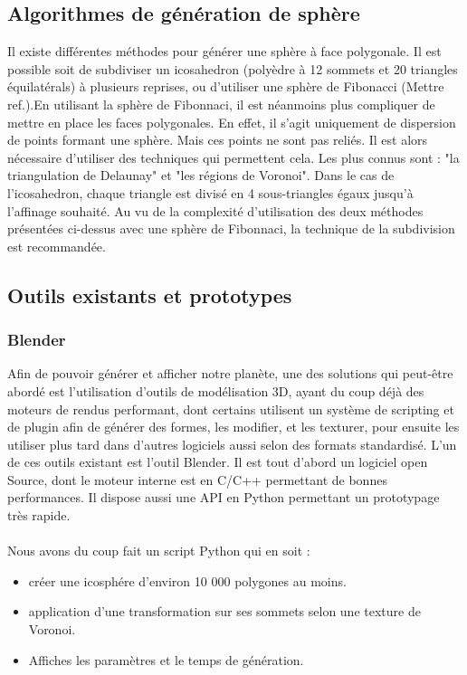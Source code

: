 \documentclass[a4paper]{article}
\begin{document}
\subsection{Algorithmes de génération de sphère}

Il existe différentes méthodes pour générer une sphère à face polygonale. Il est possible soit de subdiviser un icosahedron (polyèdre à 12 sommets et 20 triangles équilatérals) à plusieurs reprises, ou d'utiliser une sphère de Fibonacci (Mettre ref.).En utilisant la sphère de Fibonnaci, il est néanmoins plus compliquer de mettre en place les faces polygonales. En effet, il s'agit uniquement de dispersion de points formant une sphère. Mais ces points ne sont pas reliés. Il est alors nécessaire d'utiliser des techniques qui permettent cela. Les plus connus sont : "la triangulation de Delaunay" et "les régions de Voronoi". \cite{RedBlobGames}
\newline
Dans le cas de l'icosahedron, chaque triangle est divisé en 4 sous-triangles égaux jusqu'à l'affinage souhaité.
\newline
Au vu de la complexité d'utilisation des deux méthodes présentées ci-dessus avec une sphère de Fibonnaci, la technique de la subdivision est recommandée. 

\subsection{Outils existants et prototypes}

\subsubsection{Blender}

Afin de pouvoir générer et afficher notre planète, une des solutions qui peut-être abordé est l'utilisation d'outils de modélisation 3D, ayant du coup déjà des moteurs de rendus performant, dont certains utilisent un système de scripting et de plugin afin de générer des formes, les modifier, et les texturer, pour ensuite les utiliser plus tard dans d'autres logiciels aussi selon des formats standardisé.
L'un de ces outils existant est l'outil Blender. Il est tout d'abord un logiciel open Source, dont le moteur interne est en C/C++ permettant de bonnes performances. Il dispose aussi une API en Python permettant un prototypage très rapide.
\\\\
Nous avons du coup fait un script Python qui en soit :
\begin{itemize}
            \item {créer une icosphére d'environ 10 000 polygones au moins.}
            \item {application d'une transformation sur ses sommets selon une texture de Voronoi.}
            \item {Affiches les paramètres et le temps de génération.}
\end{itemize}
\end{document}
